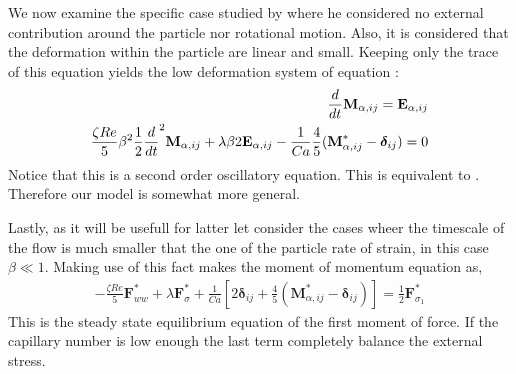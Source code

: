 We now examine the specific case studied by \citet{lamb1924hydrodynamics} where he considered no external contribution around the particle nor rotational motion.
Also, it is considered that the deformation within the particle are linear and small. 
Keeping only the trace of this equation yields the low deformation system of equation :
\begin{align*}
    \frac{d}{dt} \textbf{M}_{\alpha,ij} = \textbf{E}_{\alpha,ij}\\
    \frac{\zeta Re}{5}
        \beta^2 \frac{1}{2}\frac{d}{dt}^2 \textbf{M}_{\alpha,ij}
    + \lambda 
        \beta 2\textbf{E}_{\alpha,ij}
    - \frac{1}{Ca} 
     \frac{4  }{5} (\textbf{M}_{\alpha,ij}^* - \bm\delta_{ij})
    = 0
\end{align*}
Notice that this is a second order oscillatory equation. 
This is equivalent to  \citet{lamb1924hydrodynamics}. 
Therefore our model is somewhat more general. 

Lastly, as it will be usefull for latter let consider the cases wheer the timescale of the flow is much smaller that the one of the particle rate of strain, in this case $\beta \ll 1$. 
Making use of this fact makes the moment of momentum equation as, 
\begin{align*}
    - \frac{\zeta Re}{5}
     \textbf{F}_{ww}^*
    + \lambda  
    \textbf{F}_\sigma^*
    + \frac{1}{Ca} \left[
    2\bm\delta_{ij} 
    + \frac{4  }{5} (\textbf{M}_{\alpha,ij}^* - \bm\delta_{ij})
    \right]
    = 
    \frac{1}{2}
    \textbf{F}_{\sigma_1}^*
\end{align*}
This is the steady state equilibrium equation of the first moment of force. 
If the capillary number is low enough the last term  completely balance the external stress. 
